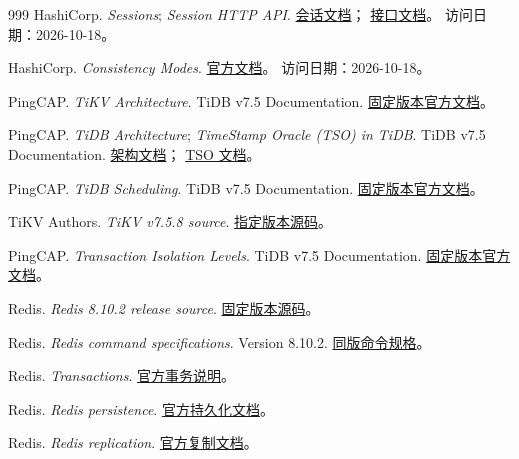\begin{thebibliography}{999}
HashiCorp.
\textit{Sessions}; \textit{Session HTTP API}.
\href{https://developer.hashicorp.com/consul/docs/dynamic-app-config/sessions}{会话文档}；
\href{https://developer.hashicorp.com/consul/api-docs/session}{接口文档}。
访问日期：2026-10-18。

HashiCorp.
\textit{Consistency Modes}.
\href{https://developer.hashicorp.com/consul/api-docs/features/consistency}{官方文档}。
访问日期：2026-10-18。

PingCAP.
\textit{TiKV Architecture}. TiDB v7.5 Documentation.
\href{https://docs.pingcap.com/tidb/v7.5/tidb-storage/}{固定版本官方文档}。

PingCAP.
\textit{TiDB Architecture}; \textit{TimeStamp Oracle (TSO) in TiDB}.
TiDB v7.5 Documentation.
\href{https://docs.pingcap.com/tidb/v7.5/tidb-architecture/}{架构文档}；
\href{https://docs.pingcap.com/tidb/v7.5/tso/}{TSO 文档}。

PingCAP.
\textit{TiDB Scheduling}. TiDB v7.5 Documentation.
\href{https://docs.pingcap.com/tidb/v7.5/tidb-scheduling/}{固定版本官方文档}。

TiKV Authors.
\textit{TiKV v7.5.8 source}.
\href{https://github.com/tikv/tikv/tree/v7.5.8/components/raftstore}{指定版本源码}。

PingCAP.
\textit{Transaction Isolation Levels}. TiDB v7.5 Documentation.
\href{https://docs.pingcap.com/tidb/v7.5/transaction-isolation-levels/}{固定版本官方文档}。

Redis.
\textit{Redis 8.10.2 release source}.
\href{https://github.com/redis/redis/tree/8.10.2}{固定版本源码}。

Redis.
\textit{Redis command specifications}. Version 8.10.2.
\href{https://github.com/redis/redis/tree/8.10.2/src/commands}{同版命令规格}。

Redis.
\textit{Transactions}.
\href{https://redis.io/docs/latest/develop/using-commands/transactions/}{官方事务说明}。

Redis.
\textit{Redis persistence}.
\href{https://redis.io/docs/latest/operate/oss_and_stack/management/persistence/}{官方持久化文档}。

Redis.
\textit{Redis replication}.
\href{https://redis.io/docs/latest/operate/oss_and_stack/management/replication/}{官方复制文档}。


\end{thebibliography}
